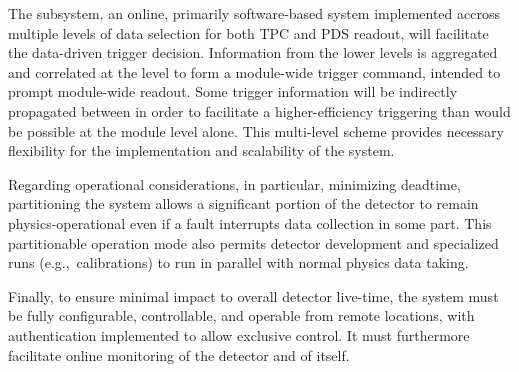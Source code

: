 The  subsystem, an online, primarily software-based system implemented accross multiple levels of data selection for both TPC and PDS readout, will facilitate the data-driven trigger decision. 
Information from the
lower  levels is aggregated and correlated at the
 level to form a module-wide trigger command, intended to
prompt module-wide readout.
Some trigger information will be indirectly propagated between  in order to facilitate a higher-efficiency  triggering than would be possible at the module level alone.
This multi-level scheme provides necessary flexibility for the
implementation and scalability of the  system. 
 
Regarding operational considerations, in particular, minimizing  deadtime, partitioning the  system allows 
a significant portion of the detector to remain physics-operational
even if a fault interrupts data collection in
some part. 
This partitionable operation mode also
permits detector development and specialized runs (e.g.,~calibrations)
to run in parallel with normal physics data taking.

Finally, to ensure minimal impact to overall detector live-time, the  system must be fully configurable,
controllable, and operable from remote locations, with
authentication implemented to allow exclusive control. It must %
furthermore facilitate online monitoring of the detector and  of itself. %



